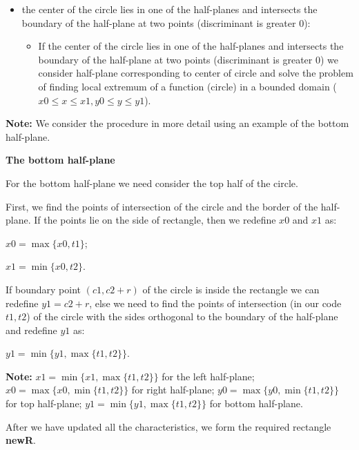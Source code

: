 \documentclass{report}
\begin{document}
\begin{itemize}
		\item the center of the circle lies in one of the half-planes and intersects the boundary of the half-plane at two points (discriminant is greater $0$):
		\begin{itemize}
			\item If the center of the circle lies in one of the half-planes and intersects the boundary of the half-plane at two points (discriminant is greater $0$) we consider half-plane corresponding to center of circle and solve the problem of finding local extremum of a function (circle) in a bounded domain ($x0 \le x \le x1, y0 \le y \le y1$).
				
		\end{itemize}
	\end{itemize}

	{\bfseries Note:}
	We consider the procedure in more detail using an example of the bottom half-plane.
	
	\parindent=10pt {\bfseries The bottom half-plane}
	\parindent=0pt
	
	For the bottom half-plane we need consider the top half of the circle.
	
	First, we find the points of intersection of the circle and the border of the half-plane.
	If the points lie on the side of rectangle, then we redefine $x0$ and $x1$ as:
	
	\parindent=50pt
	$x0 = \max\{x0, t1\}$;
	
	$x1 = \min\{x0, t2\}$.
	
	\parindent=0pt
	If boundary point $(c1, c2 + r)$ of the circle is inside the rectangle we can redefine $y1  = c2 + r$, else we need to find the points of intersection (in our code $t1, t2$) of the circle with the sides orthogonal to the boundary of the half-plane and redefine $y1$ as:
	
	 \parindent=50pt $y1 = \min\{y1, \max\{t1,t2\}\}$.
	 
	\parindent=0pt
	{\bfseries Note:}
	$x1 = \min\{x1, \max\{t1,t2\}\}$ for the left half-plane;
	$x0 = \max\{x0, \min\{t1,t2\}\}$ for right half-plane;
	$y0 = \max\{y0, \min\{t1, t2\}\}$ for top half-plane;
	$y1 = \min\{y1, \max\{t1, t2\}\}$ for bottom half-plane.
	
	
	\parindent=0pt	
	After we have updated all the characteristics, we form the required rectangle {\bfseries newR}.
	
\end{document}

